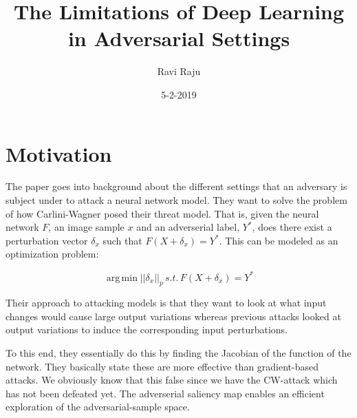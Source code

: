 \documentclass{article}
\title{The Limitations of Deep Learning in Adversarial Settings}
\date{5-2-2019}
\author{Ravi Raju}
\DeclareMathOperator*{\argmin}{arg\,min}
\begin{document}
\maketitle
{}
{}
\section{Motivation}
The paper goes into background about the different settings that an adversary is subject under to attack a neural network model. They want to solve the problem of how Carlini-Wagner posed their threat model. That is, given the neural network $F$, an image sample $x$ and an adverserial label, $Y^{*}$, does there exist a perturbation vector $\delta_x$ such that $F(X + \delta_x)=Y^{*}$. This can be modeled as an optimization problem:

\begin{equation}
\argmin ||{\delta_x}||_p\, s.t.\, F(X + \delta_{x}) = Y^{*}
\end{equation}

Their approach to attacking models is that they want to look at what input changes would cause large output variations whereas previous attacks looked at output variations to induce the corresponding input perturbations. \par 

To this end, they essentially do this by finding the Jacobian of the function of the network. They basically state these are more effective than gradient-based attacks. We obviously know that this false since we have the CW-attack which has not been defeated yet. The adverserial saliency map enables an efficient exploration of the adversarial-sample space.
\end{document}

